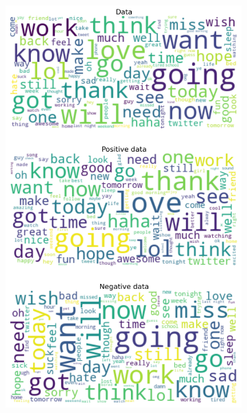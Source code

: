 \documentclass{article}
\begin{document}
\begin{itemize}
\begin{figure}[H]
\begin{subfigure}[b]{0.24\textwidth}
      \includegraphics[width=\textwidth]{chapter-06/section-01-01/01/visualization/2/wordcloud.png}
    \end{subfigure}
    \begin{subfigure}[b]{0.24\textwidth}
      \centering

\end{subfigure}
\end{figure}
\end{itemize}
\end{document}
